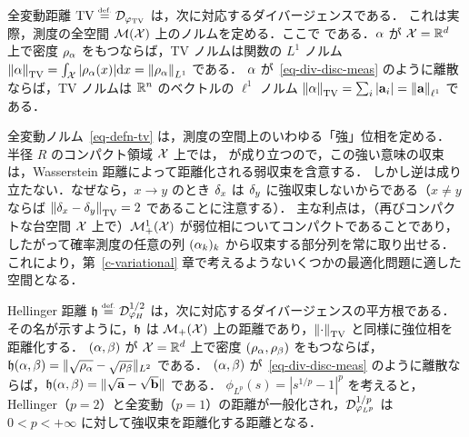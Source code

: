 \begin{example}[全変動]\label{exmp-tv}
全変動距離 $\operatorname{TV} \stackrel{\mbox{\upshape\tiny def.}}{=} \mathcal{D}_{\varphi_{\operatorname{TV}}}$ は，次に対応するダイバージェンスである．
これは実際，測度の全空間 $\mathcal{M}(\mathcal{X})$ 上のノルムを定める．ここで
である．$\alpha$ が $\mathcal{X}=\mathbb{R}^d$ 上で密度 $\rho_{\alpha}$ をもつならば，TV ノルムは関数の $L^1$ ノルム $\left\| \alpha \right\|_{\operatorname{TV}} = \int_{\mathcal{X}} |\rho_{\alpha}(x)| \mathrm{d} x = \left\| \rho_{\alpha} \right\|_{L^1}$ である．
%
$\alpha$ が~\eqref{eq-div-disc-meas} のように離散ならば，TV ノルムは $\mathbb{R}^n$ のベクトルの $\ell^1$ ノルム $\left\| \alpha \right\|_{\operatorname{TV}}=\sum_i |\mathrm{\textbf{a}}_i| = \left\| \mathrm{\textbf{a}} \right\|_{\ell^1}$ である．
\end{example}

\begin{rem}
	全変動ノルム~\eqref{eq-defn-tv} は，測度の空間上のいわゆる「強」位相を定める．
	半径 $R$ のコンパクト領域 $\mathcal{X}$ 上では，
	が成り立つので，この強い意味の収束は，Wasserstein 距離によって距離化される弱収束を含意する．
	しかし逆は成り立たない．なぜなら，$x \rightarrow y$ のとき $\delta_x$ は $\delta_y$ に強収束しないからである（$x \neq y$ ならば $\left\| \delta_x-\delta_y \right\|_{\operatorname{TV}}=2$ であることに注意する）．
	主な利点は，（再びコンパクトな台空間 $\mathcal{X}$ 上で）$\mathcal{M}_+^1(\mathcal{X})$ が弱位相についてコンパクトであることであり，したがって確率測度の任意の列 $(\alpha_k)_k$ から収束する部分列を常に取り出せる．これにより，第~\ref{c-variational} 章で考えるようないくつかの最適化問題に適した空間となる．
\end{rem}


\begin{example}[Hellinger]\label{exmp-hellinger}
	Hellinger 距離 $\mathfrak{h} \stackrel{\mbox{\upshape\tiny def.}}{=} \mathcal{D}_{\varphi_{H}}^{1/2}$ は，次に対応するダイバージェンスの平方根である．
	その名が示すように，$\mathfrak{h}$ は $\mathcal{M}_+(\mathcal{X})$ 上の距離であり，$\left\| \cdot \right\|_{\operatorname{TV}}$ と同様に強位相を距離化する．
	$(\alpha,\beta)$ が $\mathcal{X}=\mathbb{R}^d$ 上で密度 $(\rho_{\alpha},\rho_{\beta})$ をもつならば，$\mathfrak{h}(\alpha,\beta) = \| \sqrt{\rho_{\alpha}}-\sqrt{\rho_{\beta}} \|_{L^2}$ である．
	$(\alpha,\beta)$ が~\eqref{eq-div-disc-meas} のように離散ならば，$\mathfrak{h}(\alpha,\beta) = \| \sqrt{\mathrm{\textbf{a}}}-\sqrt{\mathrm{\textbf{b}}} \|$ である．
	$\phi_{L^p}(s)=|s^{1/p}-1|^p$ を考えると，Hellinger（$p=2$）と全変動（$p=1$）の距離が一般化され，$\mathcal{D}_{\varphi_{L^p}}^{1/p}$ は $0<p<+\infty$ に対して強収束を距離化する距離となる．
\end{example}



